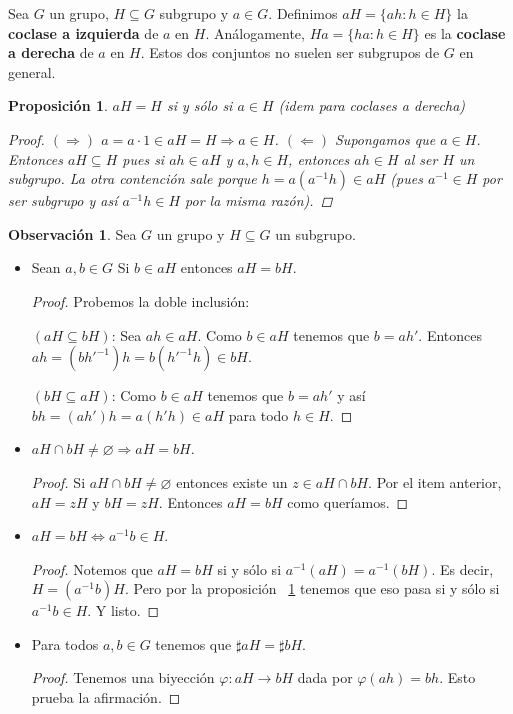 \documentclass[12pt]{book}
\newtheorem{prop}[teo]{Proposición}
\theoremstyle{definition}
\newtheorem{obs}[teo]{Observación}
\let\emptyset\varnothing
\begin{document}
Sea $G$ un grupo, $H\subseteq G$ subgrupo y $a\in G$. Definimos $aH=\{ah : h\in H\}$ la \textbf{coclase a izquierda} de $a$ en $H$. Análogamente, $Ha= \{ha : h\in H\}$ es la \textbf{coclase a derecha} de $a$ en $H$. Estos dos conjuntos no suelen ser subgrupos de $G$ en general.

\begin{prop} \label{prop::igualdaddecoclases}
$aH=H$ si y sólo si $a\in H$ (idem para coclases a derecha)
\begin{proof}
$(\Longrightarrow)$ $a=a\cdot 1 \in aH = H \Longrightarrow a\in H$.
$(\Longleftarrow)$ Supongamos que $a\in H$. Entonces $aH\subseteq H$ pues si $ah\in aH$ y $a,h\in H$, entonces $ah\in H$ al ser $H$ un subgrupo. La otra contención sale porque $h=a(a^{-1}h)\in aH$ (pues $a^{-1}\in H$ por ser subgrupo y así $a^{-1}h\in H$ por la misma razón).
\end{proof}
\end{prop}

\begin{obs}
Sea $G$ un grupo y $H\subseteq G$ un subgrupo.
\begin{itemize}
\item Sean $a,b\in G$ Si $b\in aH$ entonces $aH=bH$.
\begin{proof} Probemos la doble inclusión:

$(aH\subseteq bH)$: Sea $ah\in aH$. Como $b\in aH$ tenemos que $b=ah'$. Entonces $ah = (bh'^{-1})h = b(h'^{-1}h)\in bH$.

$(bH\subseteq aH)$: Como $b\in aH$ tenemos que $b=ah'$ y así $bh = (ah')h = a(h'h)\in aH$ para todo $h\in H$.
\end{proof}
\item $aH\cap bH\neq \emptyset \Longrightarrow aH=bH$.
\begin{proof}
Si $aH\cap bH\neq \emptyset$ entonces existe un $z\in aH\cap bH$. Por el item anterior, $aH=zH$ y $bH=zH$. Entonces $aH=bH$ como queríamos.
\end{proof}
\item $aH=bH \Longleftrightarrow a^{-1}b\in H$.
\begin{proof}
Notemos que $aH=bH$ si y sólo si $a^{-1}(aH) = a^{-1}(bH)$. Es decir, $H=(a^{-1}b)H$. Pero por la proposición ~\ref{prop::igualdaddecoclases} tenemos que eso pasa si y sólo si $a^{-1}b \in H$. Y listo.
\end{proof}
\item Para todos $a,b\in G$ tenemos que $\sharp aH = \sharp bH$.
\begin{proof}
Tenemos una biyección $\varphi:aH\to bH$ dada por $\varphi(ah)=bh$. Esto prueba la afirmación.
\end{proof}
\end{itemize}
\end{obs}
\end{document}
